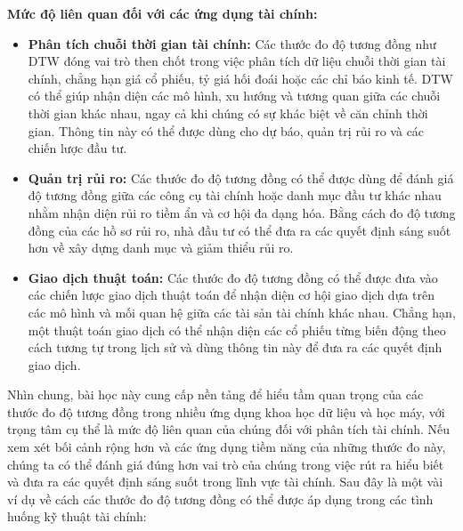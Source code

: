 \textbf{Mức độ liên quan đối với các ứng dụng tài chính:}

\begin{itemize}
  \item \textbf{Phân tích chuỗi thời gian tài chính:} Các thước đo độ tương đồng như DTW đóng vai trò then chốt trong việc phân tích dữ liệu chuỗi thời gian tài chính, chẳng hạn giá cổ phiếu, tỷ giá hối đoái hoặc các chỉ báo kinh tế. DTW có thể giúp nhận diện các mô hình, xu hướng và tương quan giữa các chuỗi thời gian khác nhau, ngay cả khi chúng có sự khác biệt về căn chỉnh thời gian. Thông tin này có thể được dùng cho dự báo, quản trị rủi ro và các chiến lược đầu tư.
  \item \textbf{Quản trị rủi ro:} Các thước đo độ tương đồng có thể được dùng để đánh giá độ tương đồng giữa các công cụ tài chính hoặc danh mục đầu tư khác nhau nhằm nhận diện rủi ro tiềm ẩn và cơ hội đa dạng hóa. Bằng cách đo độ tương đồng của các hồ sơ rủi ro, nhà đầu tư có thể đưa ra các quyết định sáng suốt hơn về xây dựng danh mục và giảm thiểu rủi ro.
  \item \textbf{Giao dịch thuật toán:} Các thước đo độ tương đồng có thể được đưa vào các chiến lược giao dịch thuật toán để nhận diện cơ hội giao dịch dựa trên các mô hình và mối quan hệ giữa các tài sản tài chính khác nhau. Chẳng hạn, một thuật toán giao dịch có thể nhận diện các cổ phiếu từng biến động theo cách tương tự trong lịch sử và dùng thông tin này để đưa ra các quyết định giao dịch.
\end{itemize}

Nhìn chung, bài học này cung cấp nền tảng để hiểu tầm quan trọng của các thước đo độ tương đồng trong nhiều ứng dụng khoa học dữ liệu và học máy, với trọng tâm cụ thể là mức độ liên quan của chúng đối với phân tích tài chính. Nếu xem xét bối cảnh rộng hơn và các ứng dụng tiềm năng của những thước đo này, chúng ta có thể đánh giá đúng hơn vai trò của chúng trong việc rút ra hiểu biết và đưa ra các quyết định sáng suốt trong lĩnh vực tài chính. Sau đây là một vài ví dụ về cách các thước đo độ tương đồng có thể được áp dụng trong các tình huống kỹ thuật tài chính:

